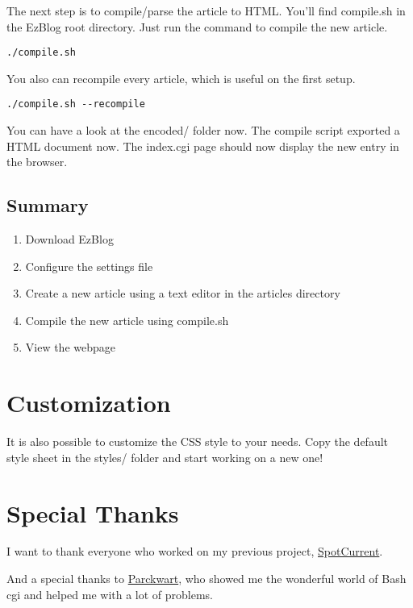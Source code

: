 \documentclass[12pt,a4paper]{article}
\begin{document}
The next step is to compile/parse the article to HTML. You'll find compile.sh in the EzBlog root directory. Just run the command to compile the new article.

\begin{verbatim}
./compile.sh
\end{verbatim}

You also can recompile every article, which is useful on the first setup.

\begin{verbatim}
./compile.sh --recompile
\end{verbatim}

You can have a look at the encoded/ folder now. The compile script exported a HTML document now. The index.cgi page should now display the new entry in the browser.

\subsection{Summary}

\begin{enumerate}
\item Download EzBlog
\item Configure the settings file
\item Create a new article using a text editor in the articles directory
\item Compile the new article using compile.sh
\item View the webpage
\end{enumerate}

\section{Customization}

It is also possible to customize the CSS style to your needs. Copy the default style sheet in the styles/ folder and start working on a new one!

\section{Special Thanks}

I want to thank everyone who worked on my previous project, \href{https://github.com/flymia/SpotCurrent}{SpotCurrent}.

And a special thanks to \href{https://www.parckwart.de}{Parckwart}, who showed me the wonderful world of Bash cgi and helped me with a lot of problems.
\end{document}
